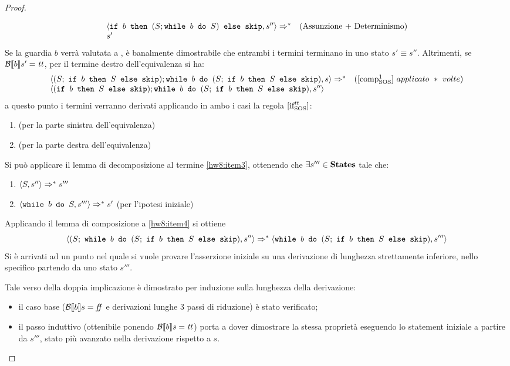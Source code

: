 \begin{proof}
\begin{itemize}
$$\begin{array}{lr}
  \confSs{\ifABC{b}{(S;\wbS{b}{S})}{\skipForFriends}}{s''} \Rar{*} & (\text{Assunzione + Determinismo})\\
  s'
  \end{array}
  $$
  Se la guardia $b$ verrà valutata a \semfalse, è banalmente dimostrabile che
  entrambi i termini terminano in uno stato $s' \equiv{} s''$.
  Altrimenti, se $\B{b}' = \semtrue$, per il termine destro dell'equivalenza 
  si ha:
  $$
  \begin{array}{lr}
  \confSs{ (S;\ \ifABC{b}{S}{\skipForFriends});
            \wbS{b}{(S;\ \ifABC{b}{S}{\skipForFriends})}
         }{s} \Rar{*}& (\compoSOS\ applicato\ *\ volte) \\
  \confSs{ (\ifABC{b}{S}{\skipForFriends});
            \wbS{b}{(S;\ \ifABC{b}{S}{\skipForFriends})}
         }{s''}
  \end{array}
  $$
  a questo punto i termini verranno derivati applicando in ambo i casi la regola
  $\ifttSOS$:
  \begin{enumerate}
    \item {} (per la parte sinistra dell'equivalenza)
    \label{hw8:item3}
    \item {}
      (per la parte destra dell'equivalenza)
  \end{enumerate}
  Si può applicare il lemma di decomposizione al termine \ref{hw8:item3},
  ottenendo che $\exists{s'''} \in \states$ tale che:
  \begin{enumerate}[label=(\alph*)]
    \item $\confSs{S}{s''} \Rar{*} s'''$
    \label{hw8:item4}
    \item $\confSs{\wbS{b}{S}}{s'''} \Rar{*} s'$ (per l'ipotesi iniziale)
    \label{hw8:item5}
  \end{enumerate}
  Applicando il lemma di composizione a \ref{hw8:item4} si ottiene
  $$
  \confSs{(S;\ \wbS{b}{(S;\ \ifABC{b}{S}{\skipForFriends})}}{s''}
    \Rar{*}
  \confSs{\wbS{b}{(S;\ \ifABC{b}{S}{\skipForFriends})}}{s'''}
  $$
  Si è arrivati ad un punto nel quale si vuole provare
  l'asserzione iniziale su una derivazione di lunghezza strettamente inferiore,
  nello specifico partendo da uno stato $s'''$.

  Tale verso della doppia implicazione è dimostrato per induzione sulla
  lunghezza della derivazione:
  \begin{itemize}
    \item il caso base ($\B{b} = \semfalse$ e derivazioni lunghe 3 passi di
      riduzione) è stato verificato;
    \item il passo induttivo (ottenibile ponendo $\B{b} = \semtrue$) porta a
      dover dimostrare la stessa proprietà eseguendo lo statement iniziale a
      partire da $s'''$, stato più avanzato nella derivazione rispetto a $s$.


\end{itemize}
\end{itemize}
\end{proof}
